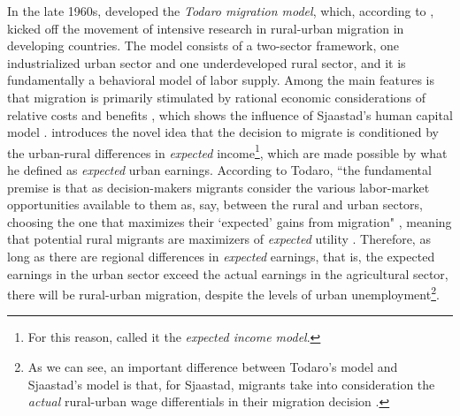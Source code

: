 In the late 1960s, \cite{todaro_model_1969} developed the \textit{Todaro migration model}, which, according to \cite{stark_migration_1991}, kicked off the movement of intensive research in rural-urban migration in developing countries. The model consists of a two-sector framework, one industrialized urban sector and one underdeveloped rural sector, and it is fundamentally a behavioral model of labor supply. Among the main features is that migration is primarily stimulated by rational economic considerations of relative costs and benefits \citep{easterlin_internal_1980}, which shows the influence of Sjaastad's human capital model \citep{shields_emergence_1989, lucas_internal_1997}. \cite{todaro_model_1969} introduces the novel idea that the decision to migrate is conditioned by the urban-rural differences in \textit{expected} income\footnote{For this reason, \cite{shields_emergence_1989} called it the \textit{expected income model}.}, which are made possible by what he defined as \textit{expected} urban earnings. According to Todaro, ``the fundamental premise is that as decision-makers migrants consider the various labor-market opportunities available to them as, say, between the rural and urban sectors, choosing the one that maximizes their `expected' gains from migration" \citep[p. 364]{easterlin_internal_1980}, meaning that potential rural migrants are maximizers of \textit{expected} utility \citep{easterlin_internal_1980}. Therefore, as long as there are regional differences in \textit{expected} earnings, that is, the expected earnings in the urban sector exceed the actual earnings in the agricultural sector, there will be rural-urban migration, despite the levels of urban unemployment\footnote{As we can see, an important difference between Todaro's model and Sjaastad's model is that, for Sjaastad, migrants take into consideration the \textit{actual} rural-urban wage differentials in their migration decision \citep{lucas_internal_1997}.}.

